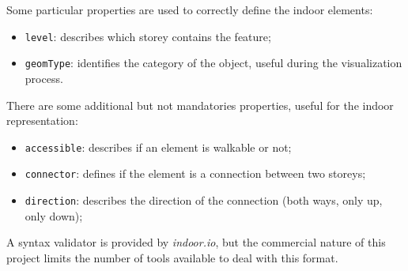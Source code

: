 Some particular properties are used to correctly define the indoor elements:

\begin{itemize}
\itemsep1pt\parskip0pt
\item
 {\tt level}: describes which storey contains the feature;
\item
 {\tt geomType}: identifies the category of the object, useful during the visualization
 process.
\end{itemize}

There are some additional but not mandatories properties, useful for
the indoor representation:

\begin{itemize}
\itemsep1pt\parskip0pt
\item
 {\tt accessible}: describes if an element is walkable or not;
\item
 {\tt connector}: defines if the element is a connection between two
 storeys;
\item
 {\tt direction}: describes the direction of the connection (both
 ways, only up, only down);
\end{itemize}

A syntax validator is provided by \emph{indoor.io}, but the commercial nature
of this project limits the number of tools available to deal with this
format.
